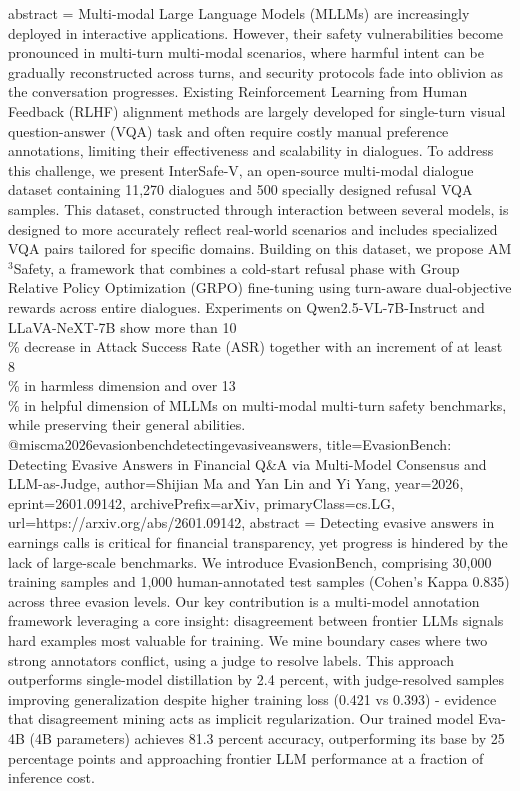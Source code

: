 {      abstract = {Multi-modal Large Language Models (MLLMs) are increasingly deployed in interactive applications. However, their safety vulnerabilities become pronounced in multi-turn multi-modal scenarios, where harmful intent can be gradually reconstructed across turns, and security protocols fade into oblivion as the conversation progresses. Existing Reinforcement Learning from Human Feedback (RLHF) alignment methods are largely developed for single-turn visual question-answer (VQA) task and often require costly manual preference annotations, limiting their effectiveness and scalability in dialogues. To address this challenge, we present InterSafe-V, an open-source multi-modal dialogue dataset containing 11,270 dialogues and 500 specially designed refusal VQA samples. This dataset, constructed through interaction between several models, is designed to more accurately reflect real-world scenarios and includes specialized VQA pairs tailored for specific domains. Building on this dataset, we propose AM$^3$Safety, a framework that combines a cold-start refusal phase with Group Relative Policy Optimization (GRPO) fine-tuning using turn-aware dual-objective rewards across entire dialogues. Experiments on Qwen2.5-VL-7B-Instruct and LLaVA-NeXT-7B show more than 10\\\% decrease in Attack Success Rate (ASR) together with an increment of at least 8\\\% in harmless dimension and over 13\\\% in helpful dimension of MLLMs on multi-modal multi-turn safety benchmarks, while preserving their general abilities.}
}@misc{ma2026evasionbenchdetectingevasiveanswers,
      title={EvasionBench: Detecting Evasive Answers in Financial Q&A via Multi-Model Consensus and LLM-as-Judge}, 
      author={Shijian Ma and Yan Lin and Yi Yang},
      year={2026},
      eprint={2601.09142},
      archivePrefix={arXiv},
      primaryClass={cs.LG},
      url={https://arxiv.org/abs/2601.09142},
      abstract = {Detecting evasive answers in earnings calls is critical for financial transparency, yet progress is hindered by the lack of large-scale benchmarks. We introduce EvasionBench, comprising 30,000 training samples and 1,000 human-annotated test samples (Cohen's Kappa 0.835) across three evasion levels. Our key contribution is a multi-model annotation framework leveraging a core insight: disagreement between frontier LLMs signals hard examples most valuable for training. We mine boundary cases where two strong annotators conflict, using a judge to resolve labels. This approach outperforms single-model distillation by 2.4 percent, with judge-resolved samples improving generalization despite higher training loss (0.421 vs 0.393) - evidence that disagreement mining acts as implicit regularization. Our trained model Eva-4B (4B parameters) achieves 81.3 percent accuracy, outperforming its base by 25 percentage points and approaching frontier LLM performance at a fraction of inference cost.}
}
